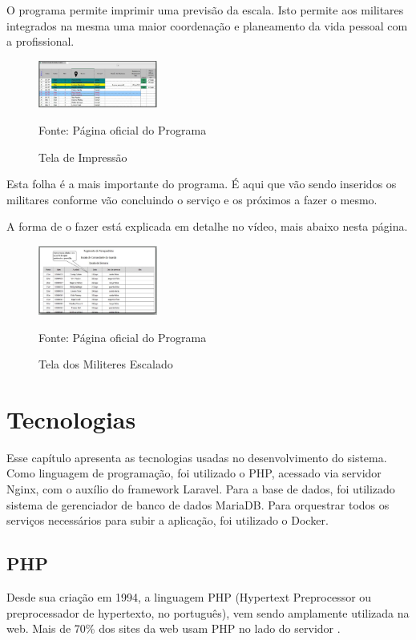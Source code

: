 O programa permite imprimir uma previsão da escala. Isto permite aos militares integrados na mesma uma maior coordenação e planeamento da vida pessoal com a profissional.

\begin{figure}[!htb]
    \centering
    \caption{Tela de Impressão}
    \includegraphics[width=0.35\textwidth]{images/01 - ESUM.png}

    {\footnotesize Fonte: Página oficial do Programa\protect\footnotemark}
    \label{fig:arduino_uno}
\end{figure}

Esta folha é a mais importante do programa. É aqui que vão sendo inseridos os militares conforme vão concluindo o serviço e os próximos a fazer o mesmo.

A forma de o fazer está explicada em detalhe no vídeo, mais abaixo nesta página.

\begin{figure}[!htb]
    \centering
    \caption{Tela dos Militeres Escalado}
    \includegraphics[width=0.35\textwidth]{images/00 - ESUM.png}

    {\footnotesize Fonte: Página oficial do Programa\protect\footnotemark}
    \label{fig:arduino_uno}
\end{figure}

\section{Tecnologias}
Esse capítulo apresenta as tecnologias usadas no desenvolvimento do sistema. Como linguagem de programação, foi utilizado o PHP, acessado via servidor Nginx, com o auxílio do framework Laravel. Para a base de dados, foi utilizado sistema de gerenciador de banco de dados MariaDB. Para orquestrar todos os serviços necessários para subir a aplicação, foi utilizado o Docker.

\subsection{PHP}
Desde sua criação em 1994, a linguagem PHP (Hypertext Preprocessor ou preprocessador de hypertexto, no português), vem sendo amplamente utilizada na web. Mais de 70\% dos sites da web usam PHP no lado do servidor \citep{w3techs}.


